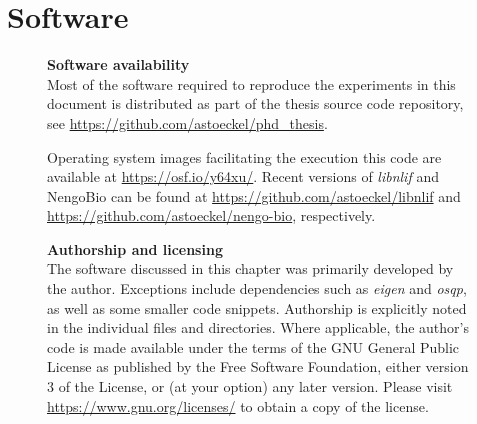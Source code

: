 
\chapter{Software}
\label{app:software}

\begin{figure}[b!]
\begin{shaded}
\small%
\sffamily%
\setlength{\parskip}{0.5em}
\noindent\textbf{Software availability}\\[0.25cm]
Most of the software required to reproduce the experiments in this document is distributed as part of the thesis source code repository, see \url{https://github.com/astoeckel/phd_thesis}.

Operating system images facilitating the execution this code are available at \url{https://osf.io/y64xu/}.
Recent versions of \emph{libnlif} and NengoBio can be found at \url{https://github.com/astoeckel/libnlif} and \url{https://github.com/astoeckel/nengo-bio}, respectively.
\end{shaded}
\end{figure}

\begin{figure}[b!]
\begin{shaded}
\small%
\sffamily%
\noindent\textbf{Authorship and licensing}\\[0.25cm]
The software discussed in this chapter was primarily developed by the author.
Exceptions include dependencies such as \emph{eigen} and \emph{osqp}, as well as some smaller code snippets.
Authorship is explicitly noted in the individual files and directories.
Where applicable, the author's code is made available under the terms of the GNU General Public License as published by
the Free Software Foundation, either version 3 of the License, or
(at your option) any later version.
Please visit \url{https://www.gnu.org/licenses/} to obtain a copy of the license.
\end{shaded}
\end{figure}



\clearpage
\setcounter{section}{0}


\clearpage
\setcounter{section}{1}

